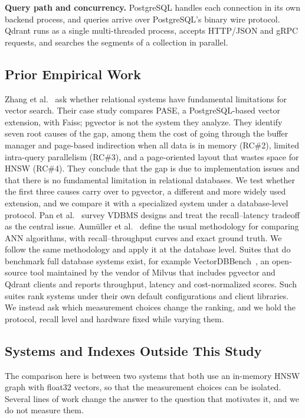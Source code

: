 \documentclass[preprint,12pt]{elsarticle}
\begin{document}
\textbf{Query path and concurrency.} PostgreSQL handles each connection in its own
backend process, and queries arrive over PostgreSQL's binary wire protocol. Qdrant runs
as a single multi-threaded process, accepts HTTP/JSON and gRPC requests, and searches the
segments of a collection in parallel.

\subsection{Prior Empirical Work}

Zhang et al.~\cite{zhang2024} ask whether relational systems have fundamental
limitations for vector search. Their case study compares PASE, a PostgreSQL-based
vector extension, with Faiss; pgvector is not the system they analyze. They identify
seven root causes of the gap, among them the cost of going through the buffer manager
and page-based indirection when all data is in memory (RC\#2), limited intra-query
parallelism (RC\#3), and a page-oriented layout that wastes space for HNSW
(RC\#4). They conclude that the gap is due to implementation issues and that there is no
fundamental limitation in relational databases. We test whether the first three causes
carry over to pgvector, a different and more widely used extension, and we compare it
with a specialized system under a database-level protocol. Pan et al.~\cite{pan2024survey} survey VDBMS
designs and treat the recall--latency tradeoff as the central issue. Aumüller et
al.~\cite{aumuller2020} define the usual methodology for comparing ANN algorithms, with
recall--throughput curves and exact ground truth. We follow the same methodology and
apply it at the database level. Suites that do benchmark full database systems exist,
for example VectorDBBench~\cite{vectordbbench}, an open-source tool maintained by the
vendor of Milvus that includes pgvector and Qdrant clients and reports throughput,
latency and cost-normalized scores. Such suites rank systems under their own default
configurations and client libraries. We instead ask which measurement choices change the
ranking, and we hold the protocol, recall level and hardware fixed while varying them.

\subsection{Systems and Indexes Outside This Study}
\label{sec:outside}

The comparison here is between two systems that both use an in-memory HNSW graph with
float32 vectors, so that the measurement choices can be isolated. Several lines of work
change the answer to the question that motivates it, and we do not measure them.
\end{document}

